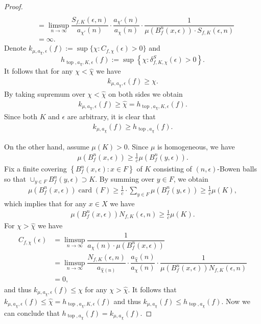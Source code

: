 \documentclass[10pt,a4paper]{amsart}
\DeclareMathOperator{\card}{card}
\newcommand{\e}{\epsilon}
\newcommand{\topo}{\operatorname{top}}
\begin{document}
\begin{proof}
\begin{align*}
    \\ 
    &=\limsup_{n\to\infty}\dfrac{S_{f,K}(\e,n)}{a_{ \chi'} (n) }\cdot \dfrac{a_{ \chi' }(n)}{a_{\chi}(n)} \cdot\dfrac{1}{ \mu(B_f^n(x,\e)) \cdot S_{f,K}(\e,n)}  
    \\
    &= \infty .
  \end{align*} 
  Denote $k_{\mu ,a_{\chi },\e} (f):= \sup \{ \chi : C_{f,\chi}(\e) > 0 \}$ and 
  \begin{equation*}
      h_{\topo,a_\chi,K,\e}(f):=
     \sup \left\{ \chi:
    \delta_{f,K,\chi}^S(\e)>0 \right\}.
  \end{equation*}
It follows that for any $\chi <  \hat{\chi } $ we have 
  \begin{align*}
    k_{\mu , a_\chi, \e  } (f ) \ge \chi .
  \end{align*}
  By taking supremum over $\chi <  \hat{\chi } $ on both sides we obtain 
  \begin{align*}
    k_{\mu ,a_{\chi }, \e } (f ) \ge  \hat{\chi }  = h_{\topo,a_{\chi }, K , \e } (f).
  \end{align*}
  Since both $K$ and $\e $ are arbitrary, it is clear that 
  \begin{align*}
    k_{\mu ,a_{\chi }} (f) \ge h_{\topo, a_{\chi }} (f).
  \end{align*} 

  On the other hand, assume $\mu (K) >0$.  Since  $\mu$ is homogeneous, we have 
  \begin{align}
    \label{eq: k=top covering}
    \mu \left( B^n_f(x,\e ) \right) \ge \frac{1}{c}  \mu \left( B^n_f(y,\e ) \right).    
  \end{align}
  Fix a finite covering $\left\{ B^n_f(x,\e ) : x \in F  \right\}$ of $K$ consisting of $(n,\e )$-Bowen balls so that $\cup_{y \in F} B^n_f(y,\e ) \supset K$.  By summing  over $y \in F$,  we obtain
  \begin{align*}
    \mu \left( B^n_f(x,\e ) \right) \card (F) \ge \frac{1}{c} \cdot \sum_{y \in F} \mu \left( B^n_f(y,\e ) \right) \ge \frac{1}{c} \mu (K),
  \end{align*}
  which implies that for any $x \in X$ we have 
  \begin{align*}
    \mu \left( B^n_f(x,\e ) \right) N_{f,K} (\e,n) \ge  \frac{1}{c}  \mu (K).
  \end{align*}
  For $\chi >  \hat{\chi } $ we have 
  \begin{align*}
    C_{f ,\chi }(\e) 
    &= \limsup_{n\to\infty}\dfrac{1}{a_\chi(n) \cdot \mu(B_f^n(x,\e))} 
    \\  
    &=\limsup_{n\to\infty}\dfrac{N_{f,K}(\e,n)}{a_{ \hat{\chi } (n) }}\cdot \dfrac{a_{ \hat{\chi } }(n)}{a_{\chi } (n)} \cdot\dfrac{1}{ \mu(B_f^n(x,\e)) N_{f,K}(\e,n)}  
    \\
    &= 0,
  \end{align*} 
  and thus $k_{\mu ,a_{\chi },\e } (f) \le  \chi $ for any $\chi >  \hat{\chi } .$ It follows that $k_{\mu ,a_{\chi },\e } (f) \le  \hat{\chi } = h_{\topo,a_{\chi }, K , \e } (f) $ and thus $k_{\mu ,a_{\chi }} (f) \le h_{\topo, a_{\chi }} (f).$ Now we can conclude that $h_{\topo, a_{\chi }} (f) = k_{\mu ,a_{\chi }} (f).$  


\end{proof}
\end{document}
